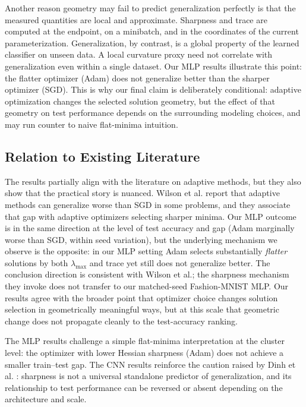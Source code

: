 \documentclass[11pt]{article}
\begin{document}
Another reason geometry may fail to predict generalization perfectly is that the measured quantities are local and approximate. Sharpness and trace are computed at the endpoint, on a minibatch, and in the coordinates of the current parameterization. Generalization, by contrast, is a global property of the learned classifier on unseen data. A local curvature proxy need not correlate with generalization even within a single dataset. Our MLP results illustrate this point: the flatter optimizer (Adam) does not generalize better than the sharper optimizer (SGD). This is why our final claim is deliberately conditional: adaptive optimization changes the selected solution geometry, but the effect of that geometry on test performance depends on the surrounding modeling choices, and may run counter to naive flat-minima intuition.

\subsection{Relation to Existing Literature}

The results partially align with the literature on adaptive methods, but they also show that the practical story is nuanced. Wilson et al. \cite{wilson2017marginal} report that adaptive methods can generalize worse than SGD in some problems, and they associate that gap with adaptive optimizers selecting sharper minima. Our MLP outcome is in the same direction at the level of test accuracy and gap (Adam marginally worse than SGD, within seed variation), but the underlying mechanism we observe is the opposite: in our MLP setting Adam selects substantially \emph{flatter} solutions by both $\lambda_{\max}$ and trace yet still does not generalize better. The conclusion direction is consistent with Wilson et al.; the sharpness mechanism they invoke does not transfer to our matched-seed Fashion-MNIST MLP. Our results agree with the broader point that optimizer choice changes solution selection in geometrically meaningful ways, but at this scale that geometric change does not propagate cleanly to the test-accuracy ranking.

The MLP results challenge a simple flat-minima interpretation \cite{hochreiter1997flat,keskar2017large} at the cluster level: the optimizer with lower Hessian sharpness (Adam) does not achieve a smaller train--test gap. The CNN results reinforce the caution raised by Dinh et al. \cite{dinh2017sharp}: sharpness is not a universal standalone predictor of generalization, and its relationship to test performance can be reversed or absent depending on the architecture and scale.
\end{document}
